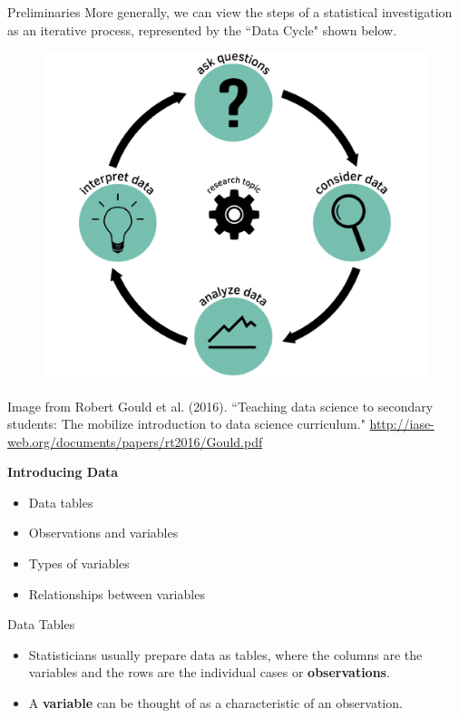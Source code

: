 \documentclass[10pt]{beamer}
\begin{document}
\begin{frame}{Preliminaries}
More generally, we can view the steps of a statistical investigation as an iterative process, represented by the ``Data Cycle" shown below.
\begin{figure}
\includegraphics[scale=0.25]{figure/data_cycle.png}
\end{figure}
\scriptsize Image from Robert Gould et al. (2016). ``Teaching data science to secondary students: The mobilize introduction to data science curriculum." \url{http://iase-web.org/documents/papers/rt2016/Gould.pdf}
\end{frame}

\begin{frame}
\large \textbf{Introducing Data}
\begin{itemize}
\item Data tables
\item Observations and variables
\item Types of variables
\item Relationships between variables
\end{itemize}
\end{frame}

\begin{frame}{Data Tables}
\begin{itemize}
\item Statisticians usually prepare data as tables, where the columns are the variables and the rows are the individual cases or \textbf{observations}.
\vspace{10pt}
\item A \textbf{variable} can be thought of as a characteristic of an observation.
\end{itemize}
\end{frame}
\end{document}
